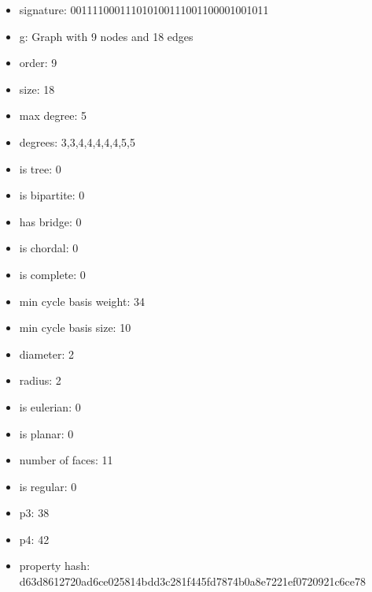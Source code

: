 \newpage
\begin{figure}
\end{figure}
\begin{itemize}
\item signature: 001111000111010100111001100001001011
\item g: Graph with 9 nodes and 18 edges
\item order: 9
\item size: 18
\item max degree: 5
\item degrees: 3,3,4,4,4,4,4,5,5
\item is tree: 0
\item is bipartite: 0
\item has bridge: 0
\item is chordal: 0
\item is complete: 0
\item min cycle basis weight: 34
\item min cycle basis size: 10
\item diameter: 2
\item radius: 2
\item is eulerian: 0
\item is planar: 0
\item number of faces: 11
\item is regular: 0
\item p3: 38
\item p4: 42
\item property hash: d63d8612720ad6ce025814bdd3c281f445fd7874b0a8e7221ef0720921c6ce78
\end{itemize}
